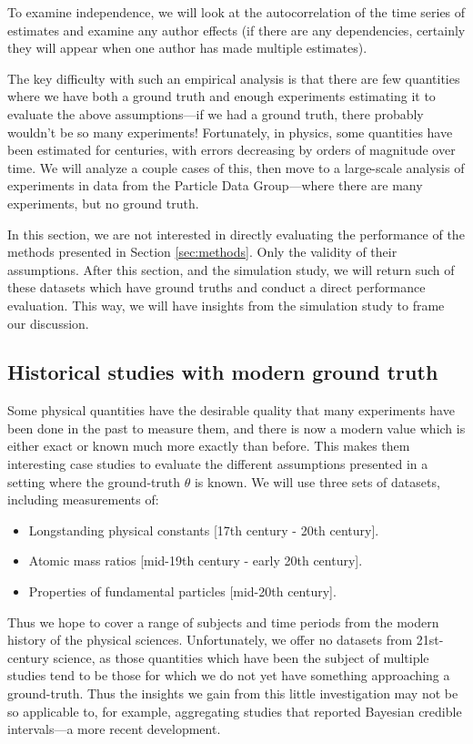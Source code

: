 \documentclass[12pt]{article}
\begin{document}
To examine independence, we will look at the autocorrelation of the time series of estimates and examine any author effects (if there are any dependencies, certainly they will appear when one author has made multiple estimates).

The key difficulty with such an empirical analysis is that there are few quantities where we have both a ground truth and enough experiments estimating it to evaluate the above assumptions---if we had a ground truth, there probably wouldn't be so many experiments! Fortunately, in physics, some quantities have been estimated for centuries, with errors decreasing by orders of magnitude over time. We will analyze a couple cases of this, then move to a large-scale analysis of experiments in data from the Particle Data Group---where there are many experiments, but no ground truth.

In this section, we are not interested in directly evaluating the performance of the methods presented in Section \ref{sec:methods}. Only the validity of their assumptions. After this section, and the simulation study, we will return such of these datasets which have ground truths and conduct a direct performance evaluation. This way, we will have insights from the simulation study to frame our discussion.

\subsection{Historical studies with modern ground truth}\label{historical-studies}

Some physical quantities have the desirable quality that many experiments have been done in the past to measure them, and there is now a modern value which is either exact or known much more exactly than before. This makes them interesting case studies to evaluate the different assumptions presented in a setting where the ground-truth $\theta$ is known. We will use three sets of datasets, including measurements of:
\begin{itemize}
  \item Longstanding physical constants [17th century - 20th century].
  \item Atomic mass ratios [mid-19th century - early 20th century].
  \item Properties of fundamental particles [mid-20th century].
\end{itemize}
Thus we hope to cover a range of subjects and time periods from the modern history of the physical sciences. Unfortunately, we offer no datasets from 21st-century science, as those quantities which have been the subject of multiple studies tend to be those for which we do not yet have something approaching a ground-truth. Thus the insights we gain from this little investigation may not be so applicable to, for example, aggregating studies that reported Bayesian credible intervals---a more recent development.
\end{document}

